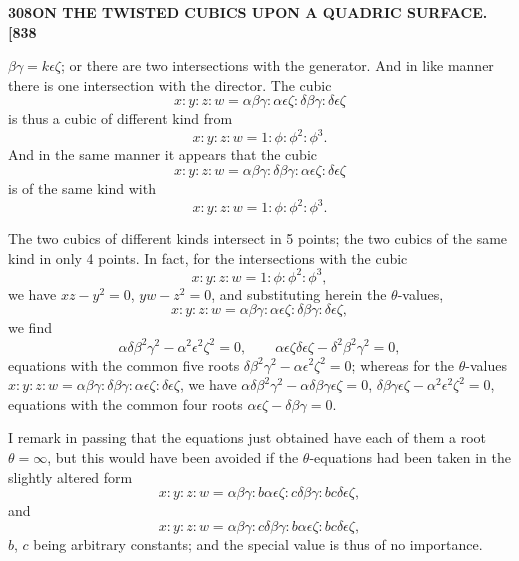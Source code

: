 \documentclass[11pt]{article}
\begin{document}
\newpage

\noindent\textbf{308}\hfill\textbf{ON THE TWISTED CUBICS UPON A QUADRIC SURFACE.}\hfill\textbf{[838}

\bigskip

\noindent $\beta\gamma = k\epsilon\zeta$; or there are two intersections with the generator. And in like manner there is one intersection with the director. The cubic
\[
x : y : z : w = \alpha\beta\gamma : \alpha\epsilon\zeta : \delta\beta\gamma : \delta\epsilon\zeta
\]
is thus a cubic of different kind from
\[
x : y : z : w = 1 : \phi : \phi^{2} : \phi^{3}.
\]
And in the same manner it appears that the cubic
\[
x : y : z : w = \alpha\beta\gamma : \delta\beta\gamma : \alpha\epsilon\zeta : \delta\epsilon\zeta
\]
is of the same kind with
\[
x : y : z : w = 1 : \phi : \phi^{2} : \phi^{3}.
\]

\medskip

The two cubics of different kinds intersect in 5 points; the two cubics of the same kind in only 4 points. In fact, for the intersections with the cubic
\[
x : y : z : w = 1 : \phi : \phi^{2} : \phi^{3},
\]
we have $xz - y^{2} = 0$, $yw - z^{2} = 0$, and substituting herein the $\theta$-values,
\[
x : y : z : w = \alpha\beta\gamma : \alpha\epsilon\zeta : \delta\beta\gamma : \delta\epsilon\zeta,
\]
we find
\[
\alpha\delta\beta^{2}\gamma^{2} - \alpha^{2}\epsilon^{2}\zeta^{2} = 0, \qquad \alpha\epsilon\zeta\delta\epsilon\zeta - \delta^{2}\beta^{2}\gamma^{2} = 0,
\]
equations with the common five roots $\delta\beta^{2}\gamma^{2} - \alpha\epsilon^{2}\zeta^{2} = 0$; whereas for the $\theta$-values $x : y : z : w = \alpha\beta\gamma : \delta\beta\gamma : \alpha\epsilon\zeta : \delta\epsilon\zeta$, we have $\alpha\delta\beta^{2}\gamma^{2} - \alpha\delta\beta\gamma\epsilon\zeta = 0$, $\delta\beta\gamma\epsilon\zeta - \alpha^{2}\epsilon^{2}\zeta^{2} = 0$, equations with the common four roots $\alpha\epsilon\zeta - \delta\beta\gamma = 0$.

\medskip

I remark in passing that the equations just obtained have each of them a root $\theta = \infty$, but this would have been avoided if the $\theta$-equations had been taken in the slightly altered form
\[
x : y : z : w = \alpha\beta\gamma : b\alpha\epsilon\zeta : c\delta\beta\gamma : bc\delta\epsilon\zeta,
\]
and
\[
x : y : z : w = \alpha\beta\gamma : c\delta\beta\gamma : b\alpha\epsilon\zeta : bc\delta\epsilon\zeta,
\]
$b$, $c$ being arbitrary constants; and the special value is thus of no importance.
\end{document}
